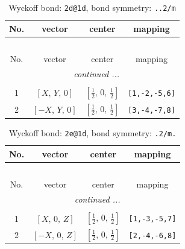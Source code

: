 \documentclass[fleqn,8pt]{jsarticle}
\begin{document}
\begin{longtable}{cccc}
\caption{Wyckoff bond: {\tt 2d@1d}, bond symmetry: {\tt ..2/m}}
 \\
 \hline \hline
No. & vector & center & mapping \\ \hline \endfirsthead

\multicolumn{3}{l}{\tablename\ \thetable{}} \\
 \hline \hline
No. & vector & center & mapping \\ \hline \endhead

 \hline \hline
\multicolumn{3}{r}{\footnotesize\it continued ...} \\ \endfoot

 \hline \hline
\multicolumn{3}{r}{} \\ \endlastfoot

1 & $\left[ X,\, Y,\, 0 \right]$ & $\left[ \frac{1}{2},\, 0,\, \frac{1}{2} \right]$ & {\tt [1,-2,-5,6]} \\ \hline
2 & $\left[ - X,\, Y,\, 0 \right]$ & $\left[ \frac{1}{2},\, 0,\, \frac{1}{2} \right]$ & {\tt [3,-4,-7,8]} \\
\end{longtable}
\renewcommand{\arraystretch}{1.2}
\begin{longtable}{cccc}
\caption{Wyckoff bond: {\tt 2e@1d}, bond symmetry: {\tt .2/m.}}
 \\
 \hline \hline
No. & vector & center & mapping \\ \hline \endfirsthead

\multicolumn{3}{l}{\tablename\ \thetable{}} \\
 \hline \hline
No. & vector & center & mapping \\ \hline \endhead

 \hline \hline
\multicolumn{3}{r}{\footnotesize\it continued ...} \\ \endfoot

 \hline \hline
\multicolumn{3}{r}{} \\ \endlastfoot

1 & $\left[ X,\, 0,\, Z \right]$ & $\left[ \frac{1}{2},\, 0,\, \frac{1}{2} \right]$ & {\tt [1,-3,-5,7]} \\ \hline
2 & $\left[ - X,\, 0,\, Z \right]$ & $\left[ \frac{1}{2},\, 0,\, \frac{1}{2} \right]$ & {\tt [2,-4,-6,8]} \\
\end{longtable}
\renewcommand{\arraystretch}{1.2}
\end{document}
